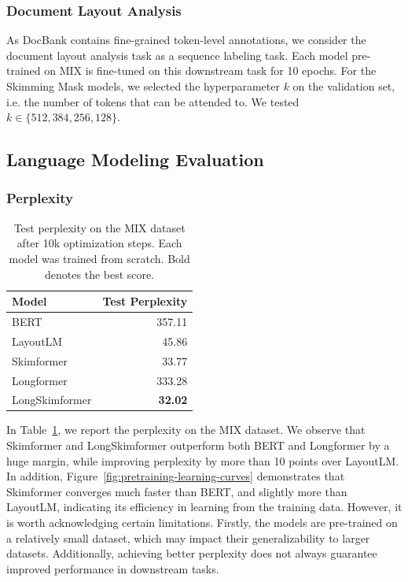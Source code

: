 \subsubsection{Document Layout Analysis}

As DocBank contains fine-grained token-level annotations, we consider the document layout analysis task as a sequence labeling task. Each model pre-trained on MIX is fine-tuned on this downstream task for 10 epochs. For the Skimming Mask models, we selected the hyperparameter $k$ on the validation set, i.e. the number of tokens that can be attended to. We tested $k \in \{512, 384, 256, 128\}$.

\subsection{Language Modeling Evaluation}

\subsubsection{Perplexity}

\begin{table}
\centering \small
\begin{tabular}{lr}
    \hline
    \textbf{Model} & \textbf{Test Perplexity}\\
    \hline
    \ac{BERT} \citep{devlin2018bert} &  357.11 \\
    LayoutLM \citep{xu2020layoutlm}    & 45.86 \\
    Skimformer                         & 33.77 \\
    \midrule
    Longformer \citep{beltagy2020longformer} & 333.28 \\
    LongSkimformer                     & \textbf{32.02} \\
    \hline
\end{tabular}
\caption{Test perplexity on the MIX dataset after 10k optimization steps. Each model was trained from scratch. Bold denotes the best score.}
\label{tab:ppl-mix}
\end{table}

In Table~\ref{tab:ppl-mix}, we report the perplexity on the MIX dataset. We observe that Skimformer and LongSkimformer outperform both \ac{BERT} and Longformer by a huge margin, while improving perplexity by more than 10 points over LayoutLM. In addition, Figure~\ref{fig:pretraining-learning-curves} demonstrates that Skimformer converges much faster than \ac{BERT}, and slightly more than LayoutLM, indicating its efficiency in learning from the training data. However, it is worth acknowledging certain limitations. Firstly, the models are pre-trained on a relatively small dataset, which may impact their generalizability to larger datasets. Additionally, achieving better perplexity does not always guarantee improved performance in downstream tasks.


